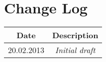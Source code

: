 \section{Change Log}
\label{sec:changelog}

\begin{tabular}{|c|c|}
\hline
Date & Description \\ \hline
20.02.2013 & {\em Initial draft}
\end{tabular}

